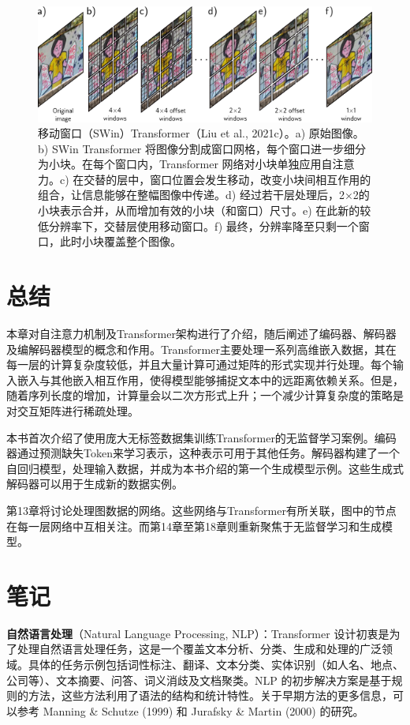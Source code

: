 \begin{figure}[ht!]
\centering
\includegraphics[width=0.7\linewidth]{png/chapter12/TransformerSWIN_compressed.png}
\caption{移动窗口（SWin）Transformer（Liu et al., 2021c）。a) 原始图像。b) SWin Transformer 将图像分割成窗口网格，每个窗口进一步细分为小块。在每个窗口内，Transformer 网络对小块单独应用自注意力。c) 在交替的层中，窗口位置会发生移动，改变小块间相互作用的组合，让信息能够在整幅图像中传递。d) 经过若干层处理后，2×2的小块表示合并，从而增加有效的小块（和窗口）尺寸。e) 在此新的较低分辨率下，交替层使用移动窗口。f) 最终，分辨率降至只剩一个窗口，此时小块覆盖整个图像。}
\end{figure}


\section{总结}
本章对自注意力机制及Transformer架构进行了介绍，随后阐述了编码器、解码器及编解码器模型的概念和作用。Transformer主要处理一系列高维嵌入数据，其在每一层的计算复杂度较低，并且大量计算可通过矩阵的形式实现并行处理。每个输入嵌入与其他嵌入相互作用，使得模型能够捕捉文本中的远距离依赖关系。但是，随着序列长度的增加，计算量会以二次方形式上升；一个减少计算复杂度的策略是对交互矩阵进行稀疏处理。

本书首次介绍了使用庞大无标签数据集训练Transformer的无监督学习案例。编码器通过预测缺失Token来学习表示，这种表示可用于其他任务。解码器构建了一个自回归模型，处理输入数据，并成为本书介绍的第一个生成模型示例。这些生成式解码器可以用于生成新的数据实例。

第13章将讨论处理图数据的网络。这些网络与Transformer有所关联，图中的节点在每一层网络中互相关注。而第14章至第18章则重新聚焦于无监督学习和生成模型。

\section{笔记}
\textbf{自然语言处理}（Natural Language Processing, NLP）：Transformer 设计初衷是为了处理自然语言处理任务，这是一个覆盖文本分析、分类、生成和处理的广泛领域。具体的任务示例包括词性标注、翻译、文本分类、实体识别（如人名、地点、公司等）、文本摘要、问答、词义消歧及文档聚类。NLP 的初步解决方案是基于规则的方法，这些方法利用了语法的结构和统计特性。关于早期方法的更多信息，可以参考 Manning \& Schutze (1999) 和 Jurafsky \& Martin (2000) 的研究。

